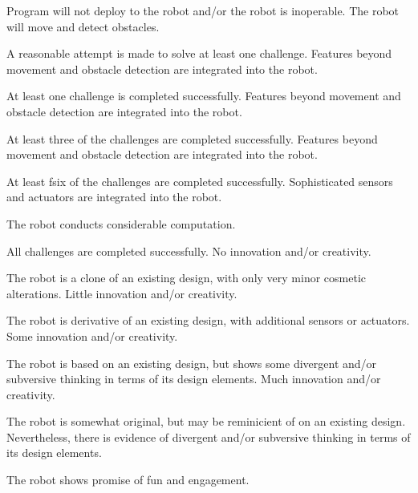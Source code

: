 \documentclass{fal_assignment}
\begin{document}
\begin{markingrubric}
%
        \grade\fail 	Program will not deploy to the robot and/or the robot is inoperable.
        \grade 		The robot will move and detect obstacles.
         \par 		A reasonable attempt is made to solve at least one challenge.
        \grade 		Features beyond movement and obstacle detection are integrated into the robot.
            \par 		At least one challenge is completed successfully. 
        \grade 		Features beyond movement and obstacle detection are integrated into the robot.
            \par 		At least three of the challenges are completed successfully. 
        \grade 		Features beyond movement and obstacle detection are integrated into the robot.
            \par 		At least fsix of the challenges are completed successfully. 
        \grade 		Sophisticated sensors and actuators are integrated into the robot.
            \par 		The robot conducts considerable computation.
            \par 		All challenges are completed successfully. 
%
        \grade\fail No innovation and/or creativity.
            \par The robot is a clone of an existing design, with only very minor cosmetic alterations.
        \grade Little innovation and/or creativity.
            \par The robot is derivative of an existing design, with additional sensors or actuators.
        \grade Some innovation and/or creativity.
            \par The robot is based on an existing design, but shows some divergent and/or subversive thinking in terms of its design elements.
        \grade Much innovation and/or creativity.
            \par The robot is somewhat original, but may be reminicient of on an existing design. 
                    Nevertheless, there is evidence of divergent and/or subversive thinking in terms of its design elements.
            \par The robot shows promise of fun and engagement.

\end{markingrubric}
\end{document}
